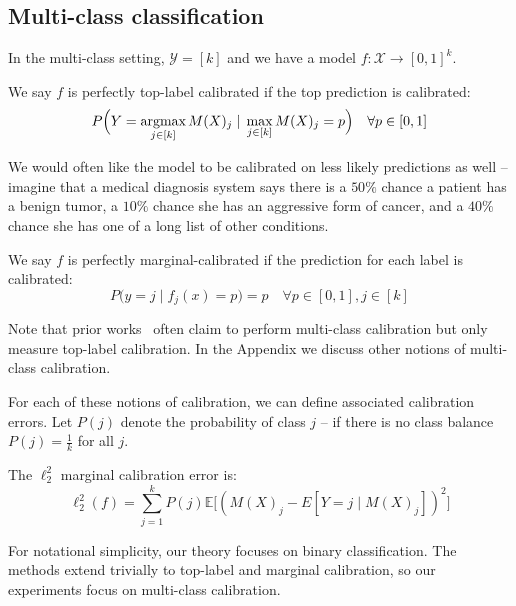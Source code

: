 \subsection{Multi-class classification}

In the multi-class setting, $\mathcal{Y} = [k]$ and we have a model $f : \mathcal{X} \to [0, 1]^k$.

\begin{definition}
We say $f$ is perfectly top-label calibrated if the top prediction is calibrated:
\[ P\Big(Y = \mathop{\mbox{argmax}}_{j \in [k]} M(X)_j \; | \; \max_{j \in [k]} M(X)_j = p\Big) \quad \forall p \in [0, 1] \]
\end{definition}

We would often like the model to be calibrated on less likely predictions as well -- imagine that a medical diagnosis system says there is a $50\%$ chance a patient has a benign tumor, a $10\%$ chance she has an aggressive form of cancer, and a $40\%$ chance she has one of a long list of other conditions.

\begin{definition}
We say $f$ is perfectly marginal-calibrated if the prediction for each label is calibrated:
\[ P\Big(y = j \; | \; f_j(x) = p\Big) = p \quad \forall p \in [0, 1], j \in [k] \]
\end{definition}

Note that prior works~\cite{guo2017calibration, hendrycks2019anomaly, hendrycks2019pretraining} often claim to perform multi-class calibration but only measure top-label calibration.
In the Appendix we discuss other notions of multi-class calibration.

For each of these notions of calibration, we can define associated calibration errors.
Let $P(j)$ denote the probability of class $j$ -- if there is no class balance $P(j) = \frac{1}{k}$ for all $j$.

\begin{definition}
The $\ell_2^2$ marginal calibration error is:
\[ \ell_2^2(f) = \sum_{j = 1}^k P(j) \mathbb{E}\big[ (M(X)_j - E[Y = j \; | \; M(X)_j])^2 \big] \]
\end{definition}

For notational simplicity, our theory focuses on binary classification.
The methods extend trivially to top-label and marginal calibration, so our experiments focus on multi-class calibration.

